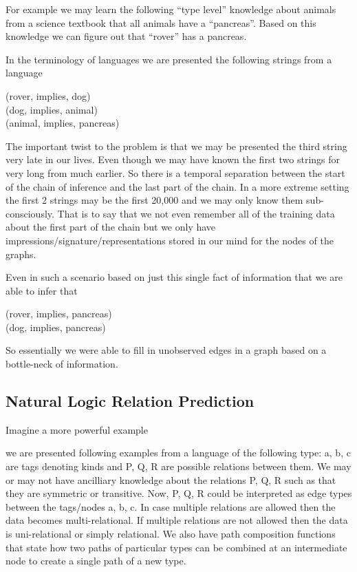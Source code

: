 \documentclass[11pt]{article}
\begin{document}
For example we may learn the following ``type level'' knowledge about
animals from a science textbook that all animals have a
``pancreas''. Based on this knowledge we can figure out that ``rover''
has a pancreas.

In the terminology of languages we are presented the following strings
from a language

(rover, implies, dog) \\
(dog, implies, animal) \\
(animal, implies, pancreas)

The important twist to the problem is that we may be presented the
third string very late in our lives.  Even though we may have known
the first two strings for very long from much earlier.  So there is a
temporal separation between the start of the chain of inference and
the last part of the chain.  In a more extreme setting the first 2
strings may be the first 20,000 and we may only know them
sub-consciously.  That is to say that we not even remember all of the
training data about the first part of the chain but we only have
impressions/signature/representations stored in our mind for the nodes
of the graphs.

Even in such a scenario based on just this single fact of information
that we are able to infer that

(rover, implies, pancreas) \\
(dog, implies, pancreas)

So essentially we were able to fill in unobserved edges in a
graph based on a bottle-neck of information.

\subsection{Natural Logic Relation Prediction}
\label{sec:natur-logic-relat}
Imagine a more powerful example

we are presented following examples from a language of the following type:
a, b, c are tags denoting kinds and P, Q, R are possible relations
between them. We may or may not have ancilliary knowledge about the
relations P, Q, R such as that they are symmetric or transitive.
Now, P, Q, R could be interpreted as edge types between the tags/nodes
a, b, c. In case multiple relations are allowed then the data becomes
multi-relational. If multiple relations are not allowed then the data
is uni-relational or simply relational. We also have path composition
functions that state how two paths of particular types can be combined
at an intermediate node to create a single path of a new type.
\end{document}
